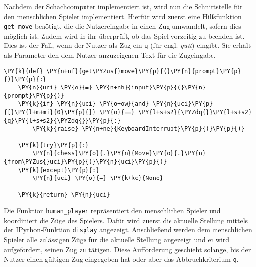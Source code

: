     Nachdem der Schachcomputer implementiert ist, wird nun die Schnittstelle
für den menschlichen Spieler implementiert. Hierfür wird zuerst eine
Hilfsfunktion \texttt{get\_move} benötigt, die die Nutzereingabe in
einen Zug umwandelt, sofern dies möglich ist. Zudem wird in ihr
überprüft, ob das Spiel vorzeitig zu beenden ist. Dies ist der Fall,
wenn der Nutzer als Zug ein \texttt{q} (für engl. \emph{quit}) eingibt.
Sie erhält als Parameter den dem Nutzer anzuzeigenen Text für die
Zugeingabe.

\bigskip

    \begin{tcolorbox}[fontupper=\linespread{.66}\selectfont, breakable, size=fbox, boxrule=1pt, pad at break*=1mm,colback=cellbackground, colframe=cellborder]
\begin{Verbatim}[commandchars=\\\{\}]
\PY{k}{def} \PY{n+nf}{get\PYZus{}move}\PY{p}{(}\PY{n}{prompt}\PY{p}{)}\PY{p}{:}
    \PY{n}{uci} \PY{o}{=} \PY{n+nb}{input}\PY{p}{(}\PY{n}{prompt}\PY{p}{)}
    \PY{k}{if} \PY{n}{uci} \PY{o+ow}{and} \PY{n}{uci}\PY{p}{[}\PY{l+m+mi}{0}\PY{p}{]} \PY{o}{==} \PY{l+s+s2}{\PYZdq{}}\PY{l+s+s2}{q}\PY{l+s+s2}{\PYZdq{}}\PY{p}{:}
        \PY{k}{raise} \PY{n+ne}{KeyboardInterrupt}\PY{p}{(}\PY{p}{)}

    \PY{k}{try}\PY{p}{:}
        \PY{n}{chess}\PY{o}{.}\PY{n}{Move}\PY{o}{.}\PY{n}{from\PYZus{}uci}\PY{p}{(}\PY{n}{uci}\PY{p}{)}
    \PY{k}{except}\PY{p}{:}
        \PY{n}{uci} \PY{o}{=} \PY{k+kc}{None}

    \PY{k}{return} \PY{n}{uci}
\end{Verbatim}
\end{tcolorbox}

    Die Funktion \texttt{human\_player} repräsentiert den menschlichen
Spieler und koordiniert die Züge des Spielers. Dafür wird zuerst die
aktuelle Stellung mittels der IPython-Funktion \texttt{display}
angezeigt. Anschließend werden dem menschlichen Spieler alle zulässigen
Züge für die aktuelle Stellung angezeigt und er wird aufgefordert,
seinen Zug zu tätigen. Diese Aufforderung geschieht solange, bis der
Nutzer einen gültigen Zug eingegeben hat oder aber das Abbruchkriterium
\texttt{q}.

\bigskip

